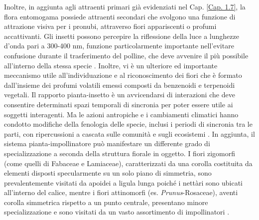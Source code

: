 \documentclass[main.tex]{subfiles}
\begin{document}
\vspace{5cm}

Inoltre, in aggiunta agli attraenti primari già evidenziati nel Cap. \ref{Cap. 1.7}, la flora entomogama possiede attraenti secondari che svolgono una funzione di attrazione visiva per i pronubi, attraverso fiori appariscenti o profumi accattivanti.
Gli insetti possono percepire la riflessione della luce a lunghezze d’onda pari a 300-400 nm, funzione particolarmente importante nell’evitare confusione durante il trasferimento del polline, che deve avvenire il più possibile all’interno della stessa specie \citep{dg}.
Inoltre, vi è un ulteriore ed importante meccanismo utile all’individuazione e al riconoscimento dei fiori che è formato dall’insieme dei profumi volatili emessi composti da benzenoidi e terpenoidi vegetali.
Il rapporto pianta-insetto è un avvicendarsi di interazioni che deve consentire determinati spazi temporali di sincronia per poter essere utile ai soggetti interagenti. Ma le azioni antropiche e i cambiamenti climatici hanno condotto modifiche della fenologia delle specie, inclusi i periodi di sincronia tra le parti, con ripercussioni a cascata sulle comunità e sugli ecosistemi \citep{laz}.
In aggiunta, il sistema pianta-impollinatore può manifestare un differente grado di specializzazione a seconda della struttura fiorale in oggetto. I fiori zigomorfi (come quelli di Fabaceae e Lamiaceae), caratterizzati da una corolla costituita da elementi disposti specularmente su un solo piano di simmetria, sono prevalentemente visitati da apoidei a ligula lunga poiché i nettàri sono ubicati all’interno del calice, mentre i fiori attinomorfi (es. \textit{Prunus}-Rosaceae), aventi corolla simmetrica rispetto a un punto centrale, presentano minore specializzazione e sono visitati da un vasto assortimento di impollinatori \citep{neal}.
\end{document}
